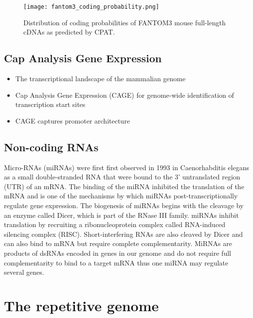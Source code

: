 \begin{figure}[h]
   \centering
   \texttt{[image: fantom3\_coding\_probability.png]}
   \caption[Coding probability of FANTOM3 mouse cDNAs]{Distribution of coding probabilities of FANTOM3 mouse full-length cDNAs as predicted by CPAT\cite{tang2014fantom3codingprob}.}
   \label{fig:fantom3_coding_prob}
\end{figure}

\subsection{Cap Analysis Gene Expression}

\begin{itemize}

   \item The transcriptional landscape of the mammalian genome\cite{pmid16141072}
   \item Cap Analysis Gene Expression (CAGE) for genome-wide identification of transcription start sites
   \item CAGE captures promoter architecture\cite{pmid16645617}

\end{itemize}

\subsection{Non-coding RNAs}

Micro-RNAs (miRNAs) were first first observed in 1993 in Caenorhabditis elegans\cite{pmid8252621} as a small double-stranded RNA that were bound to the 3' untranslated region (UTR) of an mRNA. The binding of the miRNA inhibited the translation of the mRNA and is one of the mechanisms by which miRNAs post-transcriptionally regulate gene expression. The biogenesis of miRNAs begins with the cleavage by an enzyme called Dicer\cite{pmid11201747}, which is part of the RNase III family. miRNAs inhibit translation by recruiting a ribonucleoprotein complex called RNA-induced silencing complex (RISC). Short-interfering RNAs are also cleaved by Dicer and can also bind to mRNA but require complete complementarity. MiRNAs are products of dsRNAs encoded in genes in our genome and do not require full complementarity to bind to a target mRNA thus one miRNA may regulate several genes. 

\section{The repetitive genome}

